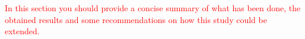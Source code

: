 \textcolor{red}{In this section you should provide a concise summary of what has been done, the obtained results and some recommendations on how this study could be extended.}

\lipsum[4]


